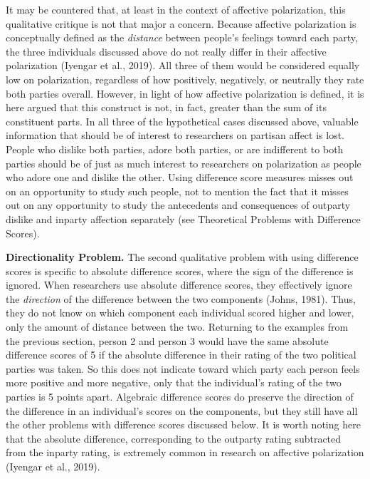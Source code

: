 \documentclass[authordate, meta]{jote-new-article}
\begin{document}
	It may be countered that, at least in the context of affective polarization, this qualitative critique is not that major a concern. Because affective polarization is conceptually defined as the \emph{distance} between people's feelings toward each party, the three individuals discussed above do not really differ in their affective polarization (Iyengar et al., 2019). All three of them would be considered equally low on polarization, regardless of how positively, negatively, or neutrally they rate both parties overall. However, in light of how affective polarization is defined, it is here argued that this construct is not, in fact, greater than the sum of its constituent parts. In all three of the hypothetical cases discussed above, valuable information that should be of interest to researchers on partisan affect is lost. People who dislike both parties, adore both parties, or are indifferent to both parties should be of just as much interest to researchers on polarization as people who adore one and dislike the other. Using difference score measures misses out on an opportunity to study such people, not to mention the fact that it misses out on any opportunity to study the antecedents and consequences of outparty dislike and inparty affection separately (see Theoretical Problems with Difference Scores).



	\textbf{Directionality Problem. }The second qualitative problem with using difference scores is specific to absolute difference scores, where the sign of the difference is ignored. When researchers use absolute difference scores, they effectively ignore the \emph{direction }of the difference between the two components (Johns, 1981). Thus, they do not know on which component each individual scored higher and lower, only the amount of distance between the two. Returning to the examples from the previous section, person 2 and person 3 would have the same absolute difference scores of 5 if the absolute difference in their rating of the two political parties was taken. So this does not indicate toward which party each person feels more positive and more negative, only that the individual's rating of the two parties is 5 points apart. Algebraic difference scores do preserve the direction of the difference in an individual's scores on the components, but they still have all the other problems with difference scores discussed below. It is worth noting here that the absolute difference, corresponding to the outparty rating subtracted from the inparty rating, is extremely common in research on affective polarization (Iyengar et al., 2019).
\end{document}
